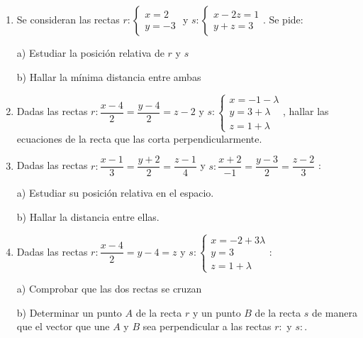 \begin{enumerate}
\item Se consideran las rectas $r:\begin{cases}x=2\\y=-3\end{cases}$ y $s:\begin{cases}x-2z=1\\y+z=3\end{cases}$. Se pide:

a) Estudiar la posición relativa de $r$ y $s$

b) Hallar la mínima distancia entre ambas 

\vspace{2mm} 

\item Dadas las rectas $r:\dfrac{x-4}2=\dfrac{y-4}2=z-2$ y $s:\begin{cases}x=-1-\lambda\\y=3+\lambda\\z=1+\lambda\end{cases}$, hallar las ecuaciones de la recta que las corta perpendicularmente.

\vspace{2mm} 

\item Dadas las rectas $r:\dfrac{x-1}{3}=\dfrac{y+2}{2}=\dfrac{z-1}{4}$ y $s:\dfrac{x+2}{-1}=\dfrac{y-3}{2}=\dfrac{z-2}{3}$ : 

a) Estudiar su posición relativa en el espacio. 

b) Hallar la distancia entre ellas. 

\vspace{2mm} 

\item Dadas las rectas  $r:\dfrac{x-4}2=y-4=z$ y $s:\begin{cases}x=-2+3\lambda\\y=3\\z=1+\lambda \end{cases}$:

a) Comprobar que las dos rectas se cruzan

b) Determinar un punto $A$ de la recta $r$ y un punto $B$ de la recta $s$ de manera que el vector que une $A$ y $B$ sea perpendicular a las rectas $r:$ y $s:$. 


\end{enumerate}
